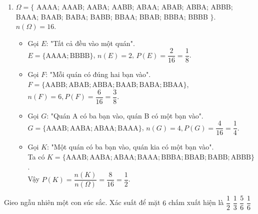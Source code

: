 \begin{bt}
{\begin{enumerate}
\begin{center}
		\end{center}
		\item $\Omega=\{$ AAAA; AAAB; AABA; AABB; ABAA; ABAB; ABBA; ABBB; BAAA; BAAB; BABA; BABB; BBAA; BBAB; BBBA; BBBB $\}$. $n(\Omega)=16$.
		\begin{itemize}
			\item Gọi $E$: "Tất cả đều vào một quán".\\
			$E=\{\mathrm{AAAA} ; \mathrm{BBBB}\}$, $n(E)=2$, $P(E)=\dfrac{2}{16}=\dfrac{1}{8}$.
			\item  Gọi $F$: "Mỗi quán có đúng hai bạn vào".\\
			$F=\{\mathrm{A A B B} ; \mathrm{A B A B} ; \mathrm{A B B A} ; \mathrm{B A A B} ; \mathrm{B A B A}; \mathrm{BBAA} \}$, $n(F)=6, P(F)=\dfrac{6}{16}=\dfrac{3}{8}$.
			\item Gọi $G$: "Quán A có ba bạn vào, quán B có một bạn vào".\\
			$ G=\{\mathrm{AAAB} ; \mathrm{AABA} ; \mathrm{ABAA} ; \mathrm{BAAA}\}$, $n(G)=4, P(G)=\dfrac{4}{16}=\dfrac{1}{4}.$
			\item Gọi $K$: "Một quán có ba bạn vào, quán kia có một bạn vào".\\
			Ta có $K=\{\mathrm{AAAB; AABA; ABAA; BAAA; BBBA; BBAB; BABB; ABBB}\}$.\\
			Vậy $P(K)=\dfrac{n(K)}{n(\Omega)}=\dfrac{8}{16}=\dfrac{1}{2}$.
		\end{itemize}
	\end{enumerate}
	}
\end{bt}

\begin{ex}%
	Gieo ngẫu nhiên một  con súc sắc. Xác suất để mặt $6$ chấm xuất hiện là
	 \choice
		{$\dfrac{1}{2}$} 
		{$\dfrac{1}{3}$} 
		{$\dfrac{5}{6}$} 
		{\True  $\dfrac{1}{6}$}
\end{ex}

